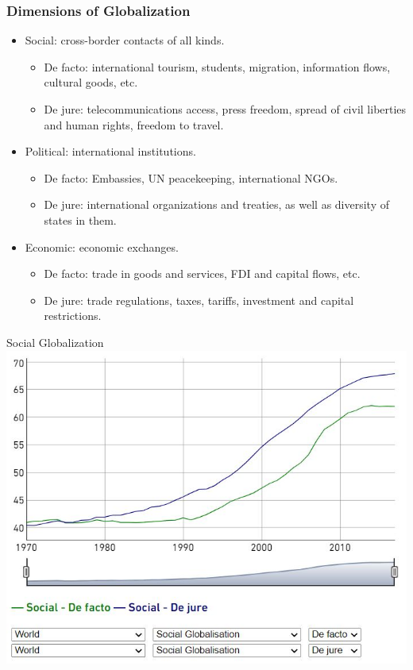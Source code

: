\documentclass{beamer}
\begin{document}
\begin{frame} 
	\frametitle{\LARGE{Dimensions of Globalization}}
	\begin{itemize}
		\item Social: cross-border contacts of all kinds. \pause
		 \begin{itemize}
		 	\item De facto: international tourism, students, migration, information flows, cultural goods, etc.
		 	\item De jure: telecommunications access, press freedom, spread of civil liberties and human rights, freedom to travel. \pause
		 \end{itemize}
		\item Political: international institutions. \pause 
			\begin{itemize}
				\item De facto: Embassies, UN peacekeeping, international NGOs.
				\item De jure: international organizations and treaties, as well as diversity of states in them. \pause
			\end{itemize}
		\item Economic: economic exchanges. \pause
		\begin{itemize}
			\item De facto: trade in goods and services, FDI and capital flows, etc.
			\item De jure: trade regulations, taxes, tariffs, investment and capital restrictions. 
		\end{itemize}
	\end{itemize}
\end{frame}

\begin{frame}{\LARGE Social Globalization}
    \centering
\includegraphics[width=\textwidth,height=0.8\textheight,keepaspectratio]{KOF social.JPG}
\end{frame}
\end{document}
